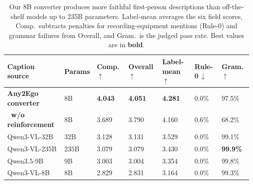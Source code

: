 \documentclass{article}
\begin{document}
\begin{table}[t]
\centering\small
\caption{Our 8B converter produces more faithful first-person descriptions than
off-the-shelf models up to 235B parameters. Label-mean averages the six field
scores, Comp.\ subtracts penalties for recording-equipment mentions (Rule-0)
and grammar failures from Overall, and Gram.\ is the judged pass rate. Best
values are in \textbf{bold}.}
\label{tab:caption}
\begin{tabular}{llC{1.25cm}C{1.3cm}C{1.55cm}C{1.2cm}C{1.2cm}}
\toprule
\textbf{Caption source} & \textbf{Params} & \textbf{Comp.}\,$\uparrow$ & \textbf{Overall}\,$\uparrow$ & \textbf{Label-mean}\,$\uparrow$ & \textbf{Rule-0}\,$\downarrow$ & \textbf{Gram.}\,$\uparrow$ \\
\midrule
\textbf{Any2Ego converter} & 8B & \textbf{4.043} & \textbf{4.051} & \textbf{4.281} & 0.0\% & 97.5\% \\
\textbf{$\;\;$w/o reinforcement} & 8B & 3.689 & 3.790 & 4.160 & 0.6\% & 68.2\% \\
\midrule
Qwen3-VL-32B & 32B & 3.128 & 3.131 & 3.529 & 0.0\% & 99.1\% \\
Qwen3-VL-235B & 235B & 3.079 & 3.079 & 3.430 & 0.0\% & \textbf{99.9\%} \\
Qwen3.5-9B & 9B & 3.003 & 3.004 & 3.354 & 0.0\% & 99.8\% \\
Qwen3-VL-8B & 8B & 2.829 & 2.831 & 3.164 & 0.0\% & 99.3\% \\
\bottomrule
\end{tabular}
\end{table}
\end{document}
